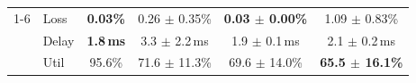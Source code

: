 \begin{table}[htbp]
\begin{tabular}{llcccc}
    \cmidrule(l){1-6}
    \multirow{3}{*}{Germany50} & Loss  & \textbf{0.03\%}  & 0.26 $\pm$ 0.35\%             & \textbf{0.03 $\pm$ 0.00\%} & 1.09 $\pm$ 0.83\% \\
                               & Delay & \textbf{1.8\,ms} & 3.3 $\pm$ 2.2\,ms            & 1.9 $\pm$ 0.1\,ms          & 2.1 $\pm$ 0.2\,ms \\
                               & Util  & 95.6\%           & 71.6 $\pm$ 11.3\%            & 69.6 $\pm$ 14.0\%          & \textbf{65.5 $\pm$ 16.1\%} \\

    \bottomrule
  \end{tabular}
\end{table}




